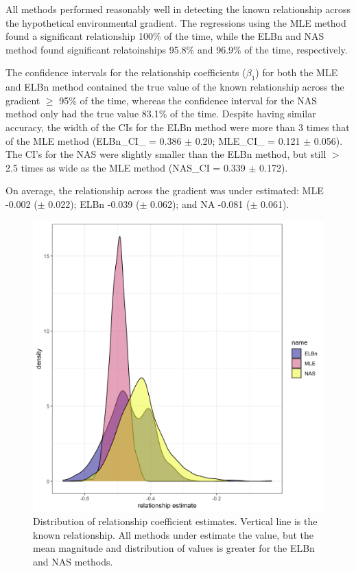 \documentclass[
]{article}
\begin{document}
All methods performed reasonably well in detecting the known
relationship across the hypothetical environmental gradient. The
regressions using the MLE method found a significant relationship 100\%
of the time, while the ELBn and NAS method found significant
relatoinships 95.8\% and 96.9\% of the time, respectively.

The confidence intervals for the relationship coefficients (\(\beta_1\))
for both the MLE and ELBn method contained the true value of the known
relationship across the gradient \(\ge\) 95\% of the time, whereas the
confidence interval for the NAS method only had the true value 83.1\% of
the time. Despite having similar accuracy, the width of the CIs for the
ELBn method were more than 3 times that of the MLE method (ELBn\_CI\_ =
0.386 \(\pm\) 0.20; MLE\_CI\_ = 0.121 \(\pm\) 0.056). The CI's for the
NAS were slightly smaller than the ELBn method, but still \(>\) 2.5
times as wide as the MLE method (NAS\_CI = 0.339 \(\pm\) 0.172).

On average, the relationship across the gradient was under estimated:
MLE -0.002 (\(\pm\) 0.022); ELBn -0.039 (\(\pm\) 0.062); and NA -0.081
(\(\pm\) 0.061).

\begin{figure}
\centering
\includegraphics{figures/PLB_sim_relationship_density.png}
\caption{Distribution of relationship coefficient estimates. Vertical
line is the known relationship. All methods under estimate the value,
but the mean magnitude and distribution of values is greater for the
ELBn and NAS methods.}
\end{figure}
\end{document}
